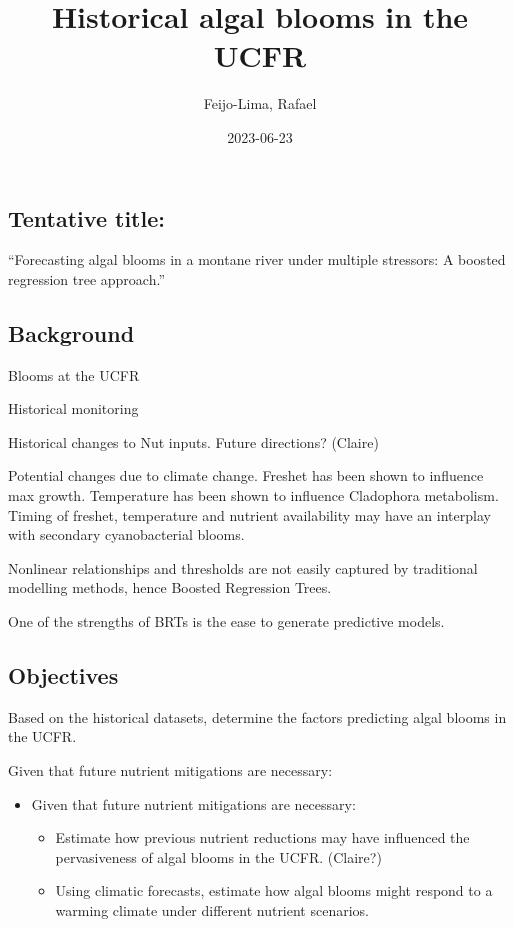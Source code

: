 \documentclass[
]{article}
\title{Historical algal blooms in the UCFR}
\author{Feijo-Lima, Rafael}
\date{2023-06-23}
\providecommand{\tightlist}{%
  \setlength{\itemsep}{0pt}\setlength{\parskip}{0pt}}
\begin{document}
\maketitle

\hypertarget{tentative-title}{%
\subsection{Tentative title:}\label{tentative-title}}

``Forecasting algal blooms in a montane river under multiple stressors:
A boosted regression tree approach.''

\hypertarget{background}{%
\subsection{Background}\label{background}}

Blooms at the UCFR

Historical monitoring

Historical changes to Nut inputs. Future directions? (Claire)

Potential changes due to climate change. Freshet has been shown to
influence max growth. Temperature has been shown to influence Cladophora
metabolism. Timing of freshet, temperature and nutrient availability may
have an interplay with secondary cyanobacterial blooms.

Nonlinear relationships and thresholds are not easily captured by
traditional modelling methods, hence Boosted Regression Trees.

One of the strengths of BRTs is the ease to generate predictive models.

\hypertarget{objectives}{%
\subsection{Objectives}\label{objectives}}

Based on the historical datasets, determine the factors predicting algal
blooms in the UCFR.

Given that future nutrient mitigations are necessary:

\begin{itemize}
\tightlist
\item
  Given that future nutrient mitigations are necessary:

  \begin{itemize}
  \tightlist
  \item
    Estimate how previous nutrient reductions may have influenced the
    pervasiveness of algal blooms in the UCFR. (Claire?)
  \item
    Using climatic forecasts, estimate how algal blooms might respond to
    a warming climate under different nutrient scenarios.
  \end{itemize}
\end{itemize}
\end{document}
